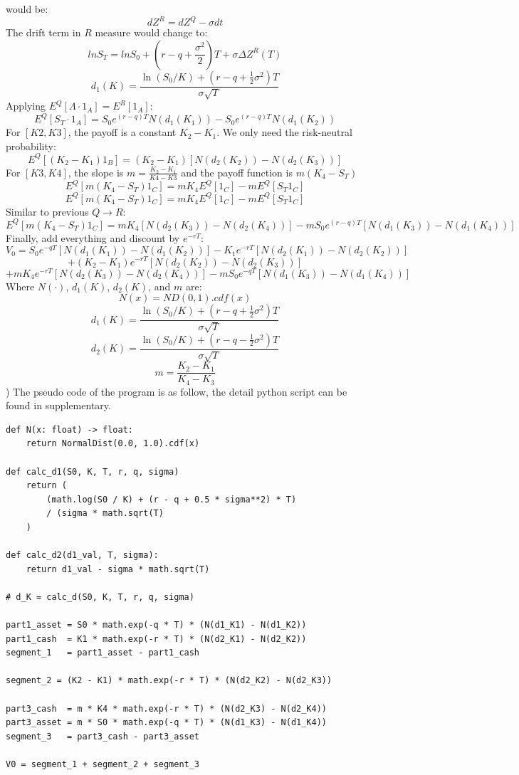\documentclass[DIN, pagenumber=false, fontsize=11pt, parskip=half]{scrartcl}
\newcommand{\mysubsection}[2]{\romannumeral #1) #2}
\begin{document}
{	would be:
	$$dZ^R = dZ^Q - \sigma dt$$
	The drift term in $R$ measure would change to:
	$$ln S_T = ln S_0 + (r - q + \frac{\sigma^2}{2})T + \sigma \Delta Z^R(T)$$
	$$d_1(K) = \frac{\ln(S_0/K) + (r-q+\frac{1}{2}\sigma^2)T}{\sigma\sqrt{T}}$$
	Applying $E^Q[\Lambda \cdot 1_A] = E^R[1_A]$:
	$$E^Q[S_T \cdot 1_A] = S_0 e^{(r-q)T} N(d_1(K_1)) - S_0 e^{(r-q)T} N(d_1(K_2))$$
	For $[K2, K3]$, the payoff is a constant $K_2 - K_1$. We only need the risk-neutral probability:
	$$E^Q[(K_2 - K_1) 1_B] = (K_2 - K_1) [N(d_2(K_2)) - N(d_2(K_3))]$$
	For $[K3, K4]$, the slope is $m = \frac{K_2-K_1}{K4-K3}$ and the payoff function is $m(K_4-S_T)$
	$$E^Q[m(K_4 - S_T)1_C] = m K_4 E^Q[1_C] - m E^Q[S_T 1_C]$$
	$$E^Q[m(K_4 - S_T)1_C] = m K_4 E^Q[1_C] - m E^Q[S_T 1_C]$$
	Similar to previous $Q \rightarrow R$:
	$$E^Q[m(K_4 - S_T)1_C] = m K_4 [N(d_2(K_3)) - N(d_2(K_4))] - m S_0 e^{(r-q)T} [N(d_1(K_3)) - N(d_1(K_4))]$$
	Finally, add everything and discount by $e^{-rT}$:
	$$V_0 = S_0 e^{-qT} [N(d_1(K_1)) - N(d_1(K_2))] - K_1 e^{-rT} [N(d_2(K_1)) - N(d_2(K_2))]$$
	$$+ (K_2 - K_1) e^{-rT} [N(d_2(K_2)) - N(d_2(K_3))]$$
	$$+ m K_4 e^{-rT} [N(d_2(K_3)) - N(d_2(K_4))] - m S_0 e^{-qT} [N(d_1(K_3)) - N(d_1(K_4))]$$
	Where $N(\cdot)$, $d_1(K)$, $d_2(K)$, and $m$ are:
	$$N(x) = ND(0, 1).cdf(x)$$
	$$d_1(K) = \frac{\ln(S_0/K) + (r-q+\frac{1}{2}\sigma^2)T}{\sigma\sqrt{T}}$$
	$$d_2(K) = \frac{\ln(S_0/K) + (r-q-\frac{1}{2}\sigma^2)T}{\sigma\sqrt{T}}$$
	$$m = \frac{K_2 - K_1}{K_4 - K_3}$$
}
\mysubsection{2}{
	The pseudo code of the program is as follow, the detail python script can be found in supplementary.
}
\begin{lstlisting}
def N(x: float) -> float:
    return NormalDist(0.0, 1.0).cdf(x)

def calc_d1(S0, K, T, r, q, sigma)
    return (
		(math.log(S0 / K) + (r - q + 0.5 * sigma**2) * T)
		/ (sigma * math.sqrt(T)
	)

def calc_d2(d1_val, T, sigma):
    return d1_val - sigma * math.sqrt(T)

# d_K = calc_d(S0, K, T, r, q, sigma)

part1_asset = S0 * math.exp(-q * T) * (N(d1_K1) - N(d1_K2))
part1_cash  = K1 * math.exp(-r * T) * (N(d2_K1) - N(d2_K2))
segment_1   = part1_asset - part1_cash

segment_2 = (K2 - K1) * math.exp(-r * T) * (N(d2_K2) - N(d2_K3))

part3_cash  = m * K4 * math.exp(-r * T) * (N(d2_K3) - N(d2_K4))
part3_asset = m * S0 * math.exp(-q * T) * (N(d1_K3) - N(d1_K4))
segment_3   = part3_cash - part3_asset

V0 = segment_1 + segment_2 + segment_3
\end{lstlisting}
\end{document}
